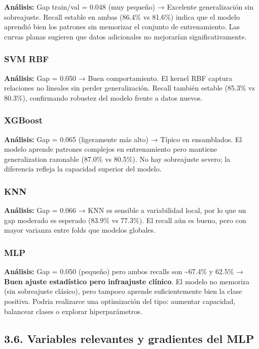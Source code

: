 \documentclass[11pt]{article}
\begin{document}
\textbf{Análisis:} Gap train/val = 0.048 (muy pequeño) → Excelente
generalización sin sobreajuste. Recall estable en ambas (86.4\% vs
81.6\%) indica que el modelo aprendió bien los patrones sin memorizar el
conjunto de entrenamiento. Las curvas planas sugieren que datos
adicionales no mejorarían significativamente.

\subsubsection{SVM RBF}\label{svm-rbf}

\textbf{Análisis:} Gap = 0.050 → Buen comportamiento. El kernel RBF
captura relaciones no lineales sin perder generalización. Recall también
estable (85.3\% vs 80.3\%), confirmando robustez del modelo frente a
datos nuevos.

\subsubsection{XGBoost}\label{xgboost}

\textbf{Análisis:} Gap = 0.065 (ligeramente más alto) → Típico en
ensamblados. El modelo aprende patrones complejos en entrenamiento pero
mantiene generalization razonable (87.0\% vs 80.5\%). No hay sobreajuste
severo; la diferencia refleja la capacidad superior del modelo.

\subsubsection{KNN}\label{knn}

\textbf{Análisis:} Gap = 0.066 → KNN es sensible a variabilidad local,
por lo que un gap moderado es esperado (83.9\% vs 77.3\%). El recall aún
es bueno, pero con mayor varianza entre folds que modelos globales.

\subsubsection{MLP}\label{mlp}

\textbf{Análisis:} Gap = 0.050 (pequeño) pero ambos recalls son
\textasciitilde67.4\% y 62.5\% → \textbf{Buen ajuste estadístico pero
infraajuste clínico}. El modelo no memoriza (sin sobreajuste clásico),
pero tampoco aprende suficientemente bien la clase positiva. Podria
realizarce una optimización del tipo: aumentar capacidad, balancear
clases o explorar hiperparámetros.

    \subsection{3.6. Variables relevantes y gradientes del
MLP}\label{variables-relevantes-y-gradientes-del-mlp}
\end{document}
